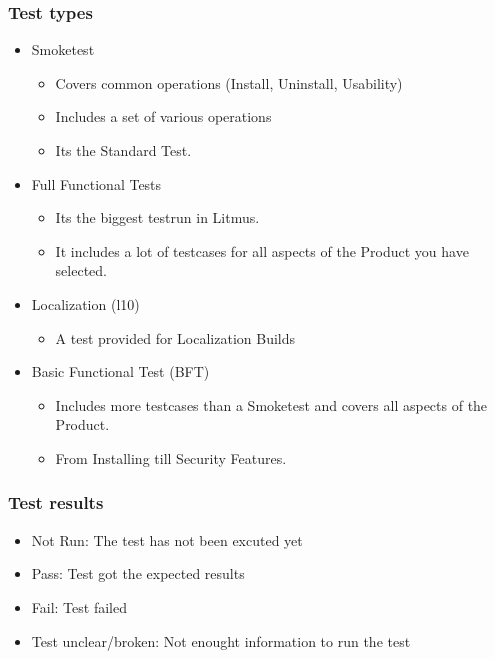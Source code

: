 \documentclass{beamer}
\begin{document}
\begin{frame}
\frametitle{Test types}
  \begin{itemize}

  \item Smoketest 
       \begin{itemize}
       \item Covers common operations (Install, Uninstall, Usability)
       \item Includes a set of various operations
       \item Its the Standard Test.
       \end{itemize}
  \item Full Functional Tests
       \begin{itemize}
       \item Its the biggest testrun in Litmus. 
       \item It includes a lot of testcases for all aspects of the Product you have selected.
       \end{itemize}
  \item Localization (l10)
       \begin{itemize}
       \item A test provided for Localization Builds
       \end{itemize}
  \item Basic Functional Test (BFT)
       \begin{itemize}
       \item Includes more testcases than a Smoketest and covers all aspects of the Product.
       \item From Installing till Security Features.
       \end{itemize}

  \end{itemize}
\end{frame}


\begin{frame}
\frametitle{Test results}
 \begin{itemize}
   \item Not Run: The test has not been excuted yet
   \item Pass: Test got the expected results
   \item Fail: Test failed
   \item Test unclear/broken: Not enought information to run the test
 \end{itemize}
\end{frame}
\end{document}

